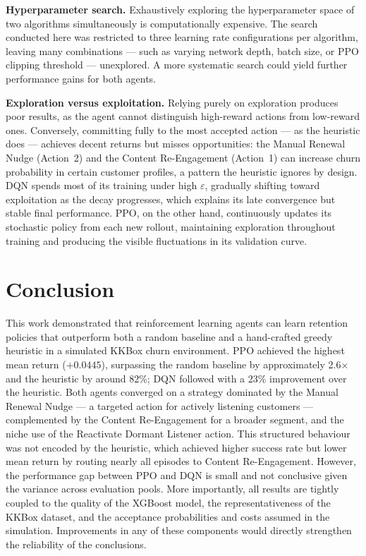 \documentclass{article}
\begin{document}
\textbf{Hyperparameter search.}
Exhaustively exploring the hyperparameter space of two algorithms simultaneously is
computationally expensive. The search conducted here was restricted to three learning
rate configurations per algorithm, leaving many combinations — such as varying network
depth, batch size, or PPO clipping threshold — unexplored. A more systematic search
could yield further performance gains for both agents.

\textbf{Exploration versus exploitation.}
Relying purely on exploration produces poor results, as the agent cannot distinguish
high-reward actions from low-reward ones. Conversely, committing fully to the most
accepted action — as the heuristic does — achieves decent returns but misses
opportunities: the Manual Renewal Nudge (Action~2) and the Content Re-Engagement
(Action~1) can increase churn probability in certain customer profiles, a pattern the
heuristic ignores by design. DQN spends most of its training under high $\varepsilon$,
gradually shifting toward exploitation as the decay progresses, which explains its late
convergence but stable final performance. PPO, on the other hand, continuously updates
its stochastic policy from each new rollout, maintaining exploration throughout training
and producing the visible fluctuations in its validation curve.

\section{Conclusion}

This work demonstrated that reinforcement learning agents can learn retention policies
that outperform both a random baseline and a hand-crafted greedy heuristic in a
simulated KKBox churn environment. PPO achieved the highest mean return ($+0.0445$),
surpassing the random baseline by approximately 2.6$\times$ and the heuristic by
around 82\%; DQN followed with a 23\% improvement over the heuristic. Both agents
converged on a strategy dominated by the Manual Renewal Nudge — a targeted action for
actively listening customers — complemented by the Content Re-Engagement for a broader
segment, and the niche use of the Reactivate Dormant Listener action. This structured
behaviour was not encoded by the heuristic, which achieved higher success rate but
lower mean return by routing nearly all episodes to Content Re-Engagement. However,
the performance gap between PPO and DQN is small and not conclusive given the variance
across evaluation pools. More importantly, all results are tightly coupled to the
quality of the XGBoost model, the representativeness of the KKBox dataset, and the
acceptance probabilities and costs assumed in the simulation. Improvements in any of
these components would directly strengthen the reliability of the conclusions.
\end{document}
